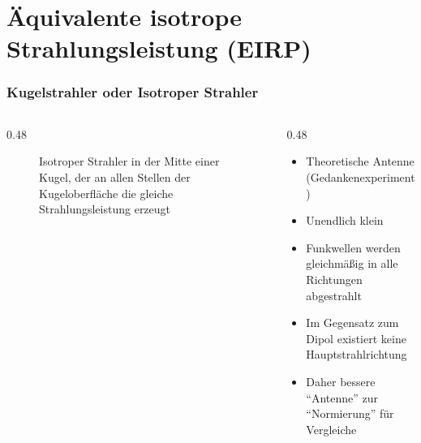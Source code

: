 \section{Äquivalente isotrope Strahlungsleistung (EIRP)}
\label{section:aequivalente_isotrope_strahlungsleistung_eirp_1}
\begin{frame}%

    \frametitle{Kugelstrahler oder Isotroper Strahler}
    \begin{columns}
        \begin{column}{0.48\textwidth}

            \begin{figure}
                \caption{\scriptsize Isotroper Strahler in der Mitte einer Kugel, der an allen Stellen der Kugeloberfläche die gleiche Strahlungsleistung erzeugt}
                \label{n_Kugelstrahler}
            \end{figure}


        \end{column}
        \begin{column}{0.48\textwidth}
            \begin{itemize}
                \item Theoretische Antenne (Gedankenexperiment)
                \item Unendlich klein
                \item Funkwellen werden gleichmäßig in alle Richtungen abgestrahlt
                \item Im Gegensatz zum Dipol existiert keine Hauptstrahlrichtung
                \item Daher bessere \enquote{Antenne} zur \enquote{Normierung} für Vergleiche
            \end{itemize}

        \end{column}
    \end{columns}

\end{frame}

